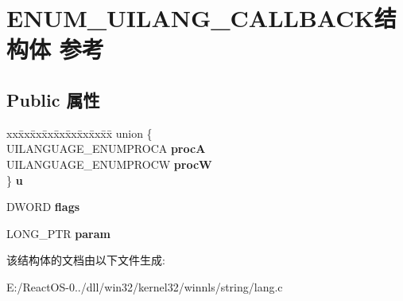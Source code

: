 \hypertarget{struct_e_n_u_m___u_i_l_a_n_g___c_a_l_l_b_a_c_k}{}\section{E\+N\+U\+M\+\_\+\+U\+I\+L\+A\+N\+G\+\_\+\+C\+A\+L\+L\+B\+A\+C\+K结构体 参考}
\label{struct_e_n_u_m___u_i_l_a_n_g___c_a_l_l_b_a_c_k}
\subsection*{Public 属性}
\begin{DoxyCompactItemize}
\item 
\mbox{\label{struct_e_n_u_m___u_i_l_a_n_g___c_a_l_l_b_a_c_k_af53136307a621ea809147e02ace199f1}} 
\begin{tabbing}
xx\=xx\=xx\=xx\=xx\=xx\=xx\=xx\=xx\=\kill
union \{\\
\>UILANGUAGE\_ENUMPROCA {\bfseries procA}\\
\>UILANGUAGE\_ENUMPROCW {\bfseries procW}\\
\} {\bfseries u}\\

\end{tabbing}\item 
\mbox{\label{struct_e_n_u_m___u_i_l_a_n_g___c_a_l_l_b_a_c_k_a8c8d2659ff29550a95d0b7da122c4c4c}} 
D\+W\+O\+RD {\bfseries flags}
\item 
\mbox{\label{struct_e_n_u_m___u_i_l_a_n_g___c_a_l_l_b_a_c_k_a79fd3daf55fb69e1126048ead0c3971d}} 
L\+O\+N\+G\+\_\+\+P\+TR {\bfseries param}
\end{DoxyCompactItemize}


该结构体的文档由以下文件生成\+:\begin{DoxyCompactItemize}
\item 
E\+:/\+React\+O\+S-\/0../dll/win32/kernel32/winnls/string/lang.\+c\end{DoxyCompactItemize}
